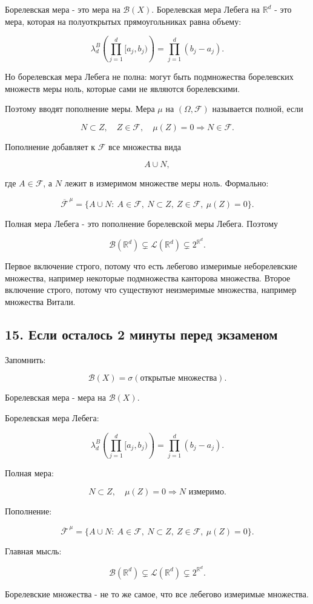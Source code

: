\documentclass[
  11pt,
  a4paper,
]{article}
\begin{document}
Борелевская мера - это мера на \(\mathcal B(X)\). Борелевская мера
Лебега на \(\mathbb R^d\) - это мера, которая на полуоткрытых
прямоугольниках равна объему:

\[
\lambda_d^B\left(\prod_{j=1}^d[a_j,b_j)\right)
=
\prod_{j=1}^d(b_j-a_j).
\]

Но борелевская мера Лебега не полна: могут быть подмножества борелевских
множеств меры ноль, которые сами не являются борелевскими.

Поэтому вводят пополнение меры. Мера \(\mu\) на \((\Omega,\mathcal F)\)
называется полной, если

\[
N\subset Z,\quad Z\in\mathcal F,\quad \mu(Z)=0
\Rightarrow N\in\mathcal F.
\]

Пополнение добавляет к \(\mathcal F\) все множества вида

\[
A\cup N,
\]

где \(A\in\mathcal F\), а \(N\) лежит в измеримом множестве меры ноль.
Формально:

\[
\overline{\mathcal F}^{\,\mu}
=
\{A\cup N:\ A\in\mathcal F,\ N\subset Z,\ Z\in\mathcal F,\ \mu(Z)=0\}.
\]

Полная мера Лебега - это пополнение борелевской меры Лебега. Поэтому

\[
\mathcal B(\mathbb R^d)\subsetneq\mathcal L(\mathbb R^d)\subsetneq 2^{\mathbb R^d}.
\]

Первое включение строго, потому что есть лебегово измеримые
неборелевские множества, например некоторые подмножества канторова
множества. Второе включение строго, потому что существуют неизмеримые
множества, например множества Витали.

\subsection{15. Если осталось 2 минуты перед
экзаменом}\label{ux435ux441ux43bux438-ux43eux441ux442ux430ux43bux43eux441ux44c-2-ux43cux438ux43dux443ux442ux44b-ux43fux435ux440ux435ux434-ux44dux43aux437ux430ux43cux435ux43dux43eux43c}

Запомнить:

\[
\mathcal B(X)=\sigma(\text{открытые множества}).
\]

Борелевская мера - мера на \(\mathcal B(X)\).

Борелевская мера Лебега:

\[
\lambda_d^B\left(\prod_{j=1}^d[a_j,b_j)\right)
=
\prod_{j=1}^d(b_j-a_j).
\]

Полная мера:

\[
N\subset Z,\quad \mu(Z)=0
\Rightarrow
N\text{ измеримо}.
\]

Пополнение:

\[
\overline{\mathcal F}^{\,\mu}
=
\{A\cup N:\ A\in\mathcal F,\ N\subset Z,\ Z\in\mathcal F,\ \mu(Z)=0\}.
\]

Главная мысль:

\[
\mathcal B(\mathbb R^d)\subsetneq\mathcal L(\mathbb R^d)\subsetneq 2^{\mathbb R^d}.
\]

Борелевские множества - не то же самое, что все лебегово измеримые
множества.

\newpage
\end{document}
